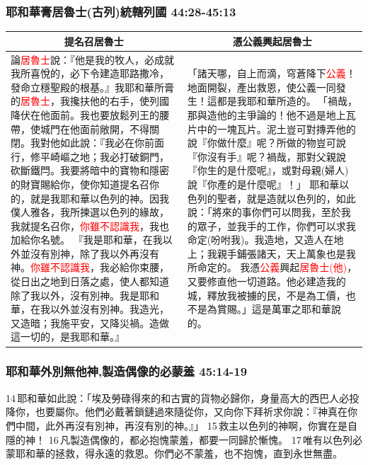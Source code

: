 \subsubsection{耶和華膏居魯士(古列)統轄列國 44:28-45:13}
\begin{table}[H]
\centering
\begin{tabular}{p{}|p{8.250cm}}\hline\hline
\multicolumn{1}{c|}{提名召居魯士}&\multicolumn{1}{c}{憑公義興起居魯士}\\\hline
論\textcolor{red}{居魯士}說：『他是我的牧人，必成就我所喜悅的，必下令建造耶路撒冷，發命立穩聖殿的根基。』我耶和華所膏的\textcolor{red}{居魯士}，我攙扶他的右手，使列國降伏在他面前。我也要放鬆列王的腰帶，使城門在他面前敞開，不得關閉。我對他如此說：『我必在你前面行，修平崎嶇之地；我必打破銅門，砍斷鐵閂。我要將暗中的寶物和隱密的財寶賜給你，使你知道提名召你的，就是我耶和華以色列的神。因我僕人雅各，我所揀選以色列的緣故，我就提名召你，\textcolor{red}{你雖不認識我}，我也加給你名號。
『我是耶和華，在我以外並沒有別神，除了我以外再沒有神。\textcolor{red}{你雖不認識我}，我必給你束腰，從日出之地到日落之處，使人都知道除了我以外，沒有別神。我是耶和華，在我以外並沒有別神。我造光，又造暗；我施平安，又降災禍。造做這一切的，是我耶和華。』
&「諸天哪，自上而滴，穹蒼降下\textcolor{red}{公義}！地面開裂，產出救恩，使公義一同發生！這都是我耶和華所造的。 「禍哉，那與造他的主爭論的！他不過是地上瓦片中的一塊瓦片。泥土豈可對摶弄他的說『你做什麼』呢？所做的物豈可說『你沒有手』呢？禍哉，那對父親說『你生的是什麼呢』，或對母親(婦人)說『你產的是什麼呢』！」
耶和華以色列的聖者，就是造就以色列的，如此說：「將來的事你們可以問我，至於我的眾子，並我手的工作，你們可以求我命定(吩咐我)。我造地，又造人在地上；我親手鋪張諸天，天上萬象也是我所命定的。
我憑\textcolor{red}{公義}興起\textcolor{red}{居魯士(他)}，又要修直他一切道路。他必建造我的城，釋放我被擄的民，不是為工價，也不是為賞賜。」這是萬軍之耶和華說的。\\\hline
\end{tabular}
\end{table}

\subsubsection{耶和華外別無他神,製造偶像的必蒙羞 45:14-19}
14 耶和華如此說：「埃及勞碌得來的和古實的貨物必歸你，身量高大的西巴人必投降你，也要屬你。他們必戴著鎖鏈過來隨從你，又向你下拜祈求你說：『神真在你們中間，此外再沒有別神，再沒有別的神。』」 15 救主以色列的神啊，你實在是自隱的神！ 16 凡製造偶像的，都必抱愧蒙羞，都要一同歸於慚愧。 17 唯有以色列必蒙耶和華的拯救，得永遠的救恩。你們必不蒙羞，也不抱愧，直到永世無盡。

